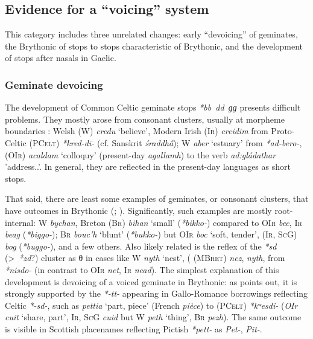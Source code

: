 \documentclass[output=paper,colorlinks,citecolor=brown]{langscibook}
\begin{document}
\subsection{Evidence for a “voicing” system}
\label{sec:evid-voic-syst}

This category includes three unrelated changes: early \enquote{devoicing} of geminates, the Brythonic  of  stops to  stops characteristic of Brythonic, and the development of  stops after nasals in Gaelic.

\subsubsection{Geminate devoicing}
\label{sec:geminate-devoicing}

The development of Common Celtic  geminate stops \textit{*bb~dd~ɡɡ} presents difficult problems. They mostly arose from consonant clusters, usually at morpheme boundaries \parencite{stifter2023celtic}: Welsh (W) \textit{credu} `believe', Modern Irish \textsc{(Ir)} \textit{creidim} from Proto-Celtic \textsc{(PCelt)} \textit{*kred-dī-} (cf. Sanskrit \textit{śraddhā́}); W \textit{aber} `estuary' from \textit{*ad-bero-},  (\textsc{OIr}) \textit{acaldam} `colloquy' (present\hyp day \textit{agallamh}) to the verb \textit{ad:gládathar} 'address.\Prs.\Tsg'. In general, they are reflected in the present\hyp day languages as short  stops.

That said, there are least some examples of  geminates, or  consonant clusters, that have  outcomes in Brythonic (\cite[159--161]{pedersen1909vergleichende}; \cite[145--146]{jørgensen2022celtic,stifter2023celtic}). Significantly, such examples are mostly root\hyp internal: W \textit{bychan}, Breton (\textsc{Br}) \textit{bihan} `small' (\textit{*bikko-}) compared to \textsc{OIr} \textit{bec}, \textsc{Ir} \textit{beag} (\textit{*biggo-}); \textsc{Br} \textit{bouc'h} `blunt' (\textit{*bukko-}) but \textsc{OIr} \textit{boc} `soft, tender', (\textsc{Ir, ScG}) \textit{bog} (\textit{*buggo-}), and a few others. Also likely related is the reflex of the \textit{*sd} (>~\textit{*zd}?) cluster as {θ} in cases like W \textit{nyth} `nest', ( (\textsc{MBret}) \textit{nez}, \textit{nyth}, from \textit{*nisdo-} (in contrast to \textsc{OIr}  \textit{net}, \textsc{Ir} \textit{nead}). The simplest explanation of this development is devoicing of a voiced geminate in Brythonic: as \textcite{stifter2023celtic} points out, it is strongly supported by the \textit{*-tt-} appearing in Gallo-Romance borrowings reflecting Celtic \textit{*-sd-}, such as \textit{pettia} `part, piece' (French \textit{pièce}) to (\textsc{PCelt}) \textit{*kʷesdi-} (\textit{OIr} \textit{cuit} `share, part', \textsc{Ir, ScG} \textit{cuid} but \textsc{W} \textit{peth} `thing', \textsc{Br} \textit{pezh}). The same outcome is visible in Scottish placenames reflecting Pictish \textit{*pett-} as \textit{Pet-}, \textit{Pit-}.
\end{document}
